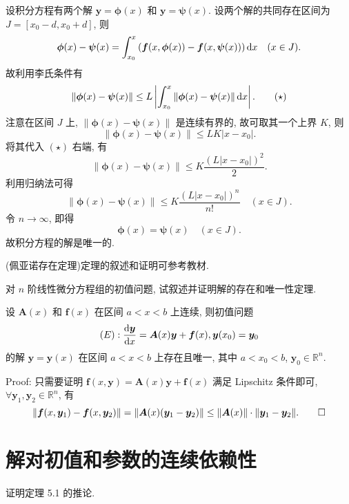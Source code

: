 \begin{solve}
  设积分方程有两个解 $\bm{y}=\bm{\phi}(x)$ 和 $\bm{y}=\bm{\psi}(x)$. 
  设两个解的共同存在区间为 $J=[x_0-d,x_0+d]$, 则
  \[\bm{\phi}(x)-\bm{\psi}(x)=\int_{x_0}^x\left(\bm{f}(x,\bm{\phi}(x))
    -\bm{f}(x,\bm{\psi}(x))\right)\mathop{}\!\mathrm{d} x\quad(x\in J).\]
  故利用李氏条件有
  \begin{equation}
    \|\bm{\phi}(x)-\bm{\psi}(x)\|
    \leq L\left|\int_{x_0}^x\|\bm{\phi}(x)-\bm{\psi}(x)\|\mathop{}\!\mathrm{d} x\right|.\tag{$\star$}
  \end{equation}
  注意在区间 $J$ 上, $\|\bm{\phi}(x)-\bm{\psi}(x)\|$ 是连续有界的, 故可取其一个上界 $K$, 则
  \[\|\bm{\phi}(x)-\bm{\psi}(x)\|\leq LK|x-x_0|.\]
  将其代入 $(\star)$ 右端, 有
  \[\|\bm{\phi}(x)-\bm{\psi}(x)\|\leq K\frac{(L|x-x_0|)^2}{2}.\]
  利用归纳法可得
  \[\|\bm{\phi}(x)-\bm{\psi}(x)\|\leq K\frac{(L|x-x_0|)^n}{n!}\quad (x\in J).\]
  令 $n\to\infty$, 即得
  \[\bm{\phi}(x)=\bm{\psi}(x)\quad (x\in J).\]
  故积分方程的解是唯一的.

  (佩亚诺存在定理)定理的叙述和证明可参考教材.
\end{solve}



\begin{exercise}
  对 $n$ 阶线性微分方程组的初值问题, 试叙述并证明解的存在和唯一性定理.
\end{exercise}

\begin{solve} 
  设 $\bm{A}(x)$ 和 $\bm{f}(x)$ 在区间 $a<x<b$ 上连续, 则初值问题
  \[(E):\frac{\mathop{}\!\mathrm{d}\bm{y}}{\mathop{}\!\mathrm{d} x}=\bm{A}(x)\bm{y}+\bm{f}(x),\bm{y}(x_0)=\bm{y}_0\]
  的解 $\bm{y}=\bm{y}(x)$ 在区间 $a<x<b$ 上存在且唯一, 其中 $a<x_0<b$, $\bm{y}_0\in\mathbb{R}^n$.

  Proof: 只需要证明 $\bm{f}(x,\bm{y})=\bm{A}(x)\bm{y}+\bm{f}(x)$ 满足 Lipschitz 条件即可, 
  $\forall\bm{y}_1,\bm{y}_2\in\mathbb{R}^n$, 有
  \[\|\bm{f}(x,\bm{y}_1)-\bm{f}(x,\bm{y}_2)\|
    = \|\bm{A}(x)(\bm{y}_1-\bm{y}_2)\|\leq\|\bm{A}(x)\|\cdot\|\bm{y}_1-\bm{y}_2\|.\qedhere\]
\end{solve}



\section{解对初值和参数的连续依赖性}



\begin{exercise}
  证明定理 5.1 的推论.
\end{exercise}



